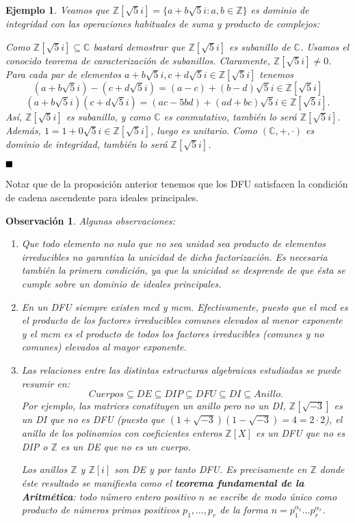 \documentclass[12pt]{article}
\newtheorem{example}{Ejemplo}[theorem]
\newtheorem{observation}{Observación}[theorem]
\begin{document}
\begin{example}Veamos que $\mathbb{Z}[\sqrt{5}i] = \lbrace a + b\sqrt{5}i: a,b \in \mathbb{Z} \rbrace$ es dominio de integridad con las operaciones habituales de suma y producto de complejos:

Como $\mathbb{Z}[\sqrt{5}i]\subseteq \mathbb{C}$ bastará demostrar que $\mathbb{Z}[\sqrt{5}i]$ es subanillo de $\mathbb{C}$. Usamos el conocido teorema de caracterización de subanillos. Claramente, $\mathbb{Z}[\sqrt{5}i] \neq 0$. Para cada par de elementos $a+b \sqrt{5}i, c+d\sqrt{5}i \in \mathbb{Z}[\sqrt{5}i]$ tenemos $$(a+b\sqrt{5}i)-(c+d\sqrt{5}i) = (a-c)+(b-d)\sqrt{5}i\in \mathbb{Z}[\sqrt{5}i]$$ $$(a+b\sqrt{5}i)(c+d\sqrt{5}i) = (ac-5bd)+(ad+bc)\sqrt{5}i\in \mathbb{Z}[\sqrt{5}i].$$ Así, $\mathbb{Z}[\sqrt{5}i]$ es subanillo, y como $\mathbb{C}$ es conmutativo, también lo será $\mathbb{Z}[\sqrt{5}i]$. Además, $1 = 1+0 \sqrt{5}i \in \mathbb{Z}[\sqrt{5}i]$, luego es unitario. Como $(\mathbb{C}, +, \cdot)$ es dominio de integridad, también lo será $\mathbb{Z}[\sqrt{5}i]$.
\end{example}

$\hfill \blacksquare$

Notar que de la proposición anterior tenemos que los DFU satisfacen la condición de cadena ascendente para ideales principales.

\begin{observation} Algunas observaciones:\begin{enumerate}
\item Que todo elemento no nulo que no sea unidad sea producto de elementos irreducibles no garantiza la unicidad de dicha factorización. Es necesaria también la primera condición, ya que la unicidad se desprende de que ésta se cumple sobre un dominio de ideales principales.
\item En un DFU siempre existen mcd y mcm. Efectivamente, puesto que el mcd es el producto de los factores irreducibles comunes elevados al menor exponente y el mcm es el producto de todos los factores irreducibles (comunes y no comunes) elevados al mayor exponente.
\item Las relaciones entre las distintas estructuras algebraicas estudiadas se puede resumir en: $$Cuerpos \subseteq DE \subseteq DIP \subseteq DFU 	\subseteq DI \subseteq Anillo.$$
Por ejemplo, las matrices constituyen un anillo pero no un DI, $\mathbb{Z}[\sqrt{-3}]$ es un DI que no es DFU (puesto que $(1+\sqrt{-3})(1-\sqrt{-3}) = 4 = 2 \cdot 2$), el anillo de los polinomios con coeficientes enteros $\mathbb{Z}[X]$ es un DFU que no es DIP o $\mathbb{Z}$ es un DE que no es un cuerpo. 

Los anillos $\mathbb{Z}$ y $\mathbb{Z}[i]$ son DE y por tanto DFU. Es precisamente en $\mathbb{Z}$ donde éste resultado se manifiesta como el \textbf{\textit{teorema fundamental de la Aritmética}}: \textit{todo número entero positivo $n$ se escribe de modo único como producto de números primos positivos $p_{1}, \ldots, p_{r}$ de la forma $n = p_{1}^{\alpha_{1}} \ldots p_{r}^{\alpha_{r}}.$}
\end{enumerate}
\end{observation}
\end{document}
